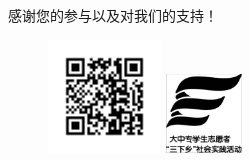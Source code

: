 \documentclass{article}
\begin{document}
\begin{spacing}{0.9}
\begin{enumerate}
感谢您的参与以及对我们的支持！
\end{enumerate}
\begin{figure}
    \begin{minipage}{3cm}
    \flushleft
\includegraphics[width=3cm]{qrcode.jpg}
    \end{minipage}
\begin{minipage}{2cm}
 \flushleft
    \includegraphics[width=2cm]{xiaxiang.png}
\end{minipage}
\end{figure}
\end{spacing}
\end{document}
